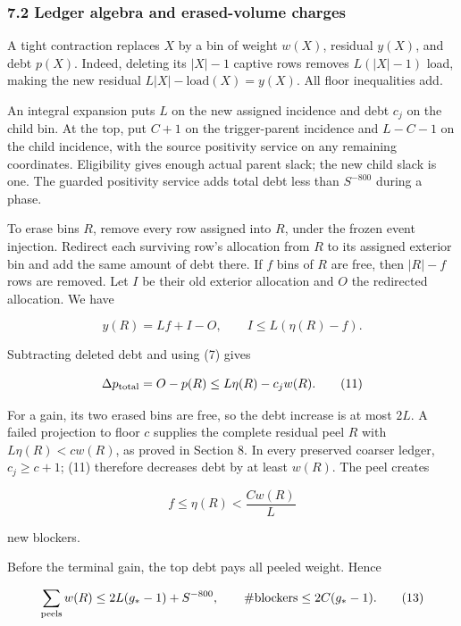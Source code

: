 \hypertarget{af-46593eb93e-ledger-algebra-and-erased-volume-charges}{%
\subsubsection{7.2 Ledger algebra and erased-volume charges}\label{af-46593eb93e-ledger-algebra-and-erased-volume-charges}}

A tight contraction replaces \(X\) by a bin of weight \(w(X)\), residual \(y(X)\), and debt \(p(X)\). Indeed, deleting its \(|X|-1\) captive rows removes \(L(|X|-1)\) load, making the new residual \(L|X|-\mathrm{load}(X)=y(X)\). All floor inequalities add.

An integral expansion puts \(L\) on the new assigned incidence and debt \(c_j\) on the child bin. At the top, put \(C+1\) on the trigger-parent incidence and \(L-C-1\) on the child incidence, with the source positivity service on any remaining coordinates. Eligibility gives enough actual parent slack; the new child slack is one. The guarded positivity service adds total debt less than \(S^{-800}\) during a phase.

To erase bins \(R\), remove every row assigned into \(R\), under the frozen event injection. Redirect each surviving row's allocation from \(R\) to its assigned exterior bin and add the same amount of debt there. If \(f\) bins of \(R\) are free, then \(|R|-f\) rows are removed. Let \(I\) be their old exterior allocation and \(O\) the redirected allocation. We have

\[
y(R)=Lf+I-O,\qquad
 I\leq L(\eta(R)-f).
\]

Subtracting deleted debt and using (7) gives

\[
\Delta p_{\rm total}=O-p(R)\leq L\eta(R)-c_jw(R).
 \tag{11}
\]

For a gain, its two erased bins are free, so the debt increase is at most \(2L\). A failed projection to floor \(c\) supplies the complete residual peel \(R\) with \(L\eta(R)<cw(R)\), as proved in Section 8. In every preserved coarser ledger, \(c_j\geq c+1\); (11) therefore decreases debt by at least \(w(R)\). The peel creates

\[
f\leq\eta(R)<\frac{Cw(R)}{L}
 \tag{12}
\]

new blockers.

Before the terminal gain, the top debt pays all peeled weight. Hence

\[
\sum_{\rm peels}w(R)\leq2L(g_*-1)+S^{-800},
 \qquad
 \#\mathrm{blockers}\leq2C(g_*-1).
 \tag{13}
\]

